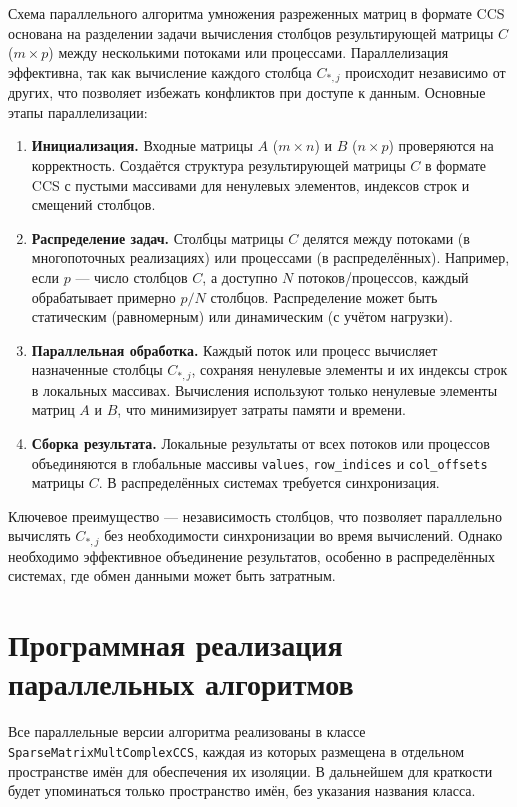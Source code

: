 \documentclass[12pt]{extarticle}
\begin{document}
\hspace*{1.25cm}Схема параллельного алгоритма умножения разреженных матриц в формате CCS основана на разделении задачи вычисления столбцов результирующей матрицы $C$ ($m \times p$) между несколькими потоками или процессами. Параллелизация эффективна, так как вычисление каждого столбца $C_{*,j}$ происходит независимо от других, что позволяет избежать конфликтов при доступе к данным. Основные этапы параллелизации:

\begin{enumerate}
    \item \textbf{Инициализация.} Входные матрицы $A$ ($m \times n$) и $B$ ($n \times p$) проверяются на корректность. Создаётся структура результирующей матрицы $C$ в формате CCS с пустыми массивами для ненулевых элементов, индексов строк и смещений столбцов.

    \item \textbf{Распределение задач.} Столбцы матрицы $C$ делятся между потоками (в многопоточных реализациях) или процессами (в распределённых). Например, если $p$ — число столбцов $C$, а доступно $N$ потоков/процессов, каждый обрабатывает примерно $p/N$ столбцов. Распределение может быть статическим (равномерным) или динамическим (с учётом нагрузки).

    \item \textbf{Параллельная обработка.} Каждый поток или процесс вычисляет назначенные столбцы $C_{*,j}$, сохраняя ненулевые элементы и их индексы строк в локальных массивах. Вычисления используют только ненулевые элементы матриц $A$ и $B$, что минимизирует затраты памяти и времени.

    \item \textbf{Сборка результата.} Локальные результаты от всех потоков или процессов объединяются в глобальные массивы \texttt{values}, \texttt{row\_indices} и \texttt{col\_offsets} матрицы $C$. В распределённых системах требуется синхронизация.

\end{enumerate}

Ключевое преимущество — независимость столбцов, что позволяет параллельно вычислять $C_{*,j}$ без необходимости синхронизации во время вычислений. Однако необходимо эффективное объединение результатов, особенно в распределённых системах, где обмен данными может быть затратным.

\section{Программная реализация параллельных алгоритмов}
\hspace*{1.25cm}Все параллельные версии алгоритма реализованы в классе \texttt{SparseMatrixMultComplexCCS}, каждая из которых размещена в отдельном пространстве имён для обеспечения их изоляции. В дальнейшем для краткости будет упоминаться только пространство имён, без указания названия класса.
\end{document}
